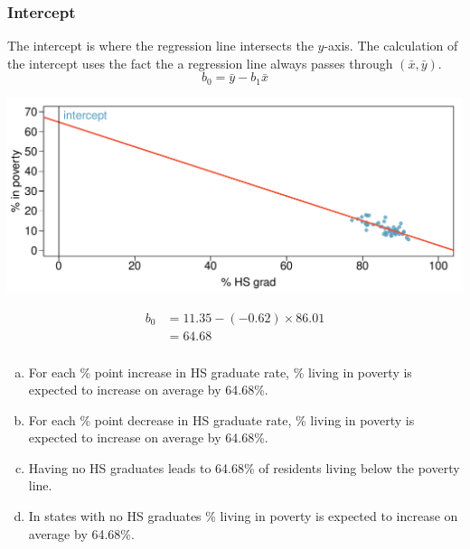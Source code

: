 
\begin{frame}
\frametitle{Intercept}

{The intercept is where the regression line intersects the $y$-axis. The calculation of the intercept uses the fact the a regression line always passes through $(\bar{x},\bar{y})$.
\[ b_0 = \bar{y} - b_1 \bar{x} \]
}

\pause

{
\begin{center}
\includegraphics[width=\textwidth]{8-2_least_square_reg/figures/poverty/poverty_hsgrad_line_wide}
\end{center}
}
{
\pause
\begin{align*}
b_0 &= 11.35 - (-0.62) \times 86.01 \\
&= 64.68
\end{align*}
}

\end{frame}


\begin{frame}
\frametitle{}


\begin{enumerate}[(a)]
\item For each \% point increase in HS graduate rate, \% living in poverty is expected to increase on average by 64.68\%.
\item For each \% point decrease in HS graduate rate, \% living in poverty is expected to increase on average by 64.68\%.
\item Having no HS graduates leads to 64.68\% of residents living below the poverty line.
\item In states with no HS graduates \% living in poverty is expected to increase on average by 64.68\%.
\end{enumerate}

\end{frame}

